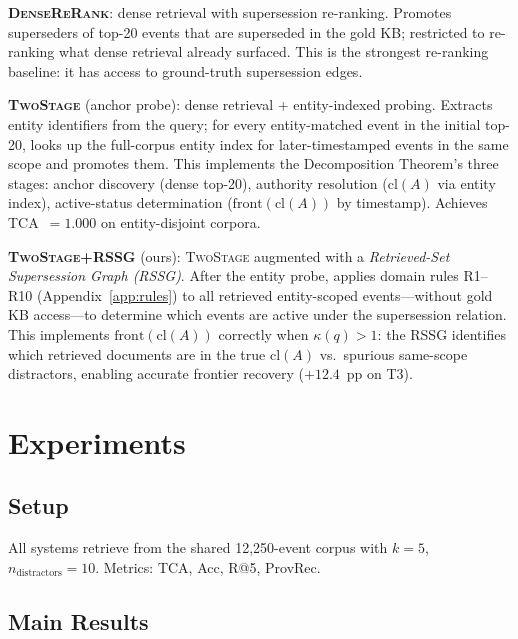 \documentclass[11pt]{article}
\newcommand{\sys}{\textsc{TwoStage}}
\newcommand{\sysplus}{\textsc{TwoStage+RSSG}}
\newcommand{\sysbase}{\textsc{DenseReRank}}
\begin{document}
\textbf{\sysbase{}}: dense retrieval with supersession re-ranking. Promotes superseders of top-20 events that are superseded in the gold KB; restricted to re-ranking what dense retrieval already surfaced. This is the strongest re-ranking baseline: it has access to ground-truth supersession edges.

\textbf{\sys{}} (anchor probe): dense retrieval + entity-indexed probing. Extracts entity identifiers from the query; for every entity-matched event in the initial top-20, looks up the full-corpus entity index for later-timestamped events in the same scope and promotes them. This implements the Decomposition Theorem's three stages: anchor discovery (dense top-20), authority resolution ($\mathrm{cl}(A)$ via entity index), active-status determination ($\mathrm{front}(\mathrm{cl}(A))$ by timestamp). Achieves TCA~$= 1.000$ on entity-disjoint corpora.

\textbf{\sysplus{}} (ours): \sys{} augmented with a \emph{Retrieved-Set Supersession Graph (RSSG)}. After the entity probe, applies domain rules R1--R10 (Appendix~\ref{app:rules}) to all retrieved entity-scoped events---without gold KB access---to determine which events are active under the supersession relation. This implements $\mathrm{front}(\mathrm{cl}(A))$ correctly when $\kappa(q) > 1$: the RSSG identifies which retrieved documents are in the true $\mathrm{cl}(A)$ vs.\ spurious same-scope distractors, enabling accurate frontier recovery ($+12.4$~pp on T3).

\section{Experiments}
\label{sec:experiments}

\subsection{Setup}

All systems retrieve from the shared 12,250-event corpus with $k = 5$, $n_\text{distractors} = 10$. Metrics: TCA, Acc, R@5, ProvRec.

\subsection{Main Results}
\end{document}
